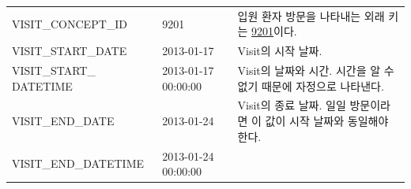 \documentclass[10.5pt]{book}
\theoremstyle{definition}
\theoremstyle{definition}
\theoremstyle{definition}
\theoremstyle{remark}
\begin{document}
\begin{longtable}[]{@{}lll@{}}
\begin{minipage}[t]{0.28\columnwidth}
VISIT\_CONCEPT\_ID\strut
\end{minipage} & \begin{minipage}[t]{0.16\columnwidth}\raggedright\strut
9201\strut
\end{minipage} & \begin{minipage}[t]{0.48\columnwidth}\raggedright\strut
입원 환자 방문을 나타내는 외래 키는
\href{http://athena.ohdsi.org/search-terms/terms/9201}{9201}이다.\strut
\end{minipage}\tabularnewline
\begin{minipage}[t]{0.28\columnwidth}\raggedright\strut
VISIT\_START\_DATE\strut
\end{minipage} & \begin{minipage}[t]{0.16\columnwidth}\raggedright\strut
2013-01-17\strut
\end{minipage} & \begin{minipage}[t]{0.48\columnwidth}\raggedright\strut
Visit의 시작 날짜.\strut
\end{minipage}\tabularnewline
\begin{minipage}[t]{0.28\columnwidth}\raggedright\strut
VISIT\_START\_ DATETIME\strut
\end{minipage} & \begin{minipage}[t]{0.16\columnwidth}\raggedright\strut
2013-01-17 00:00:00\strut
\end{minipage} & \begin{minipage}[t]{0.48\columnwidth}\raggedright\strut
Visit의 날짜와 시간. 시간을 알 수 없기 때문에 자정으로 나타낸다.\strut
\end{minipage}\tabularnewline
\begin{minipage}[t]{0.28\columnwidth}\raggedright\strut
VISIT\_END\_DATE\strut
\end{minipage} & \begin{minipage}[t]{0.16\columnwidth}\raggedright\strut
2013-01-24\strut
\end{minipage} & \begin{minipage}[t]{0.48\columnwidth}\raggedright\strut
Visit의 종료 날짜. 일일 방문이라면 이 값이 시작 날짜와 동일해야
한다.\strut
\end{minipage}\tabularnewline
\begin{minipage}[t]{0.28\columnwidth}\raggedright\strut
VISIT\_END\_DATETIME\strut
\end{minipage} & \begin{minipage}[t]{0.16\columnwidth}\raggedright\strut
2013-01-24 00:00:00\strut
\end{minipage} & \begin{minipage}[t]{0.48\columnwidth}\raggedright\strut

\end{minipage}
\end{longtable}
\end{document}
